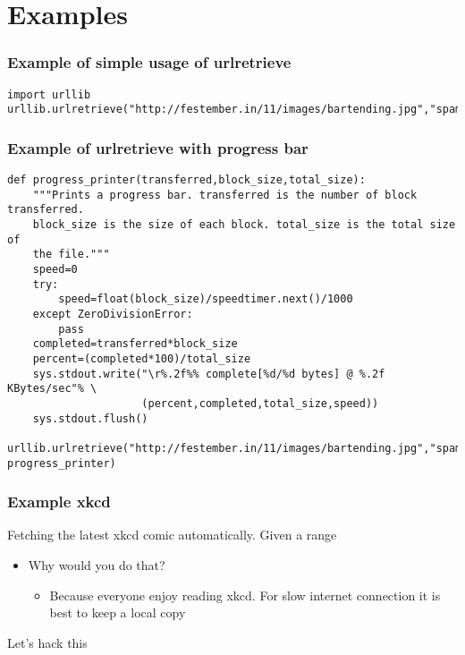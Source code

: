 \documentclass{beamer}
\begin{document}
\section{Examples}
\label{sec-7}
\begin{frame}[fragile]
\frametitle{Example of simple usage of urlretrieve}
\label{sec-7_1}

\begin{verbatim}
import urllib
urllib.urlretrieve("http://festember.in/11/images/bartending.jpg","spam.jpg")
\end{verbatim}
\end{frame}
\begin{frame}[fragile]
\frametitle{Example of urlretrieve with progress bar}
\label{sec-7_2}

\begin{verbatim}
def progress_printer(transferred,block_size,total_size):
    """Prints a progress bar. transferred is the number of block transferred.
    block_size is the size of each block. total_size is the total size of
    the file."""
    speed=0
    try:
        speed=float(block_size)/speedtimer.next()/1000
    except ZeroDivisionError:
        pass
    completed=transferred*block_size
    percent=(completed*100)/total_size
    sys.stdout.write("\r%.2f%% complete[%d/%d bytes] @ %.2f KBytes/sec"% \
                     (percent,completed,total_size,speed))
    sys.stdout.flush()
    
urllib.urlretrieve("http://festember.in/11/images/bartending.jpg","spam.jpg", progress_printer)
\end{verbatim}
\end{frame}
\begin{frame}
\frametitle{Example xkcd}
\label{sec-7_3}

  Fetching the latest xkcd comic automatically. Given a range

\begin{itemize}
\item Why would you do that?
\begin{itemize}
\item Because everyone enjoy reading xkcd. For slow internet connection it is best to keep a local copy
\end{itemize}
\end{itemize}
  Let's hack this
\end{frame}
\end{document}
